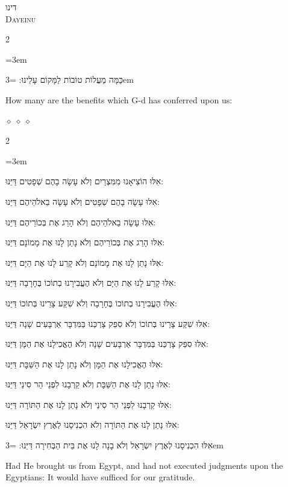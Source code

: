 \documentclass[11pt, openany]{book}
\newenvironment{bilingual}{%
  \par\vspace{4pt}%
  \begin{paracol}{2}%
}{%
  \end{paracol}%
  \par\vspace{2pt}%
}
\newenvironment{hebrewcol}{%
  \switchcolumn[1]%
  \begingroup
  \RTL
  \hebrewfont\large
  \setstretch{1.4}%
  \emergencystretch=3em
  \tolerance=9999
  \parindent=0pt\relax
}{%
  \endRTL
  \endgroup
}
\newenvironment{englishcol}{%
  \switchcolumn[0]%
  \begingroup
  \setstretch{1.4}%
  \emergencystretch=3em
  \tolerance=9999
  \normalsize
  \rightskip=0.12in\relax
}{%
  \endgroup
}
\newcommand{\parasep}{%
  \par\vspace{3pt}
  \begin{center}
    \textcolor{sedergold!50}{\tiny$\diamond\;\diamond\;\diamond$}
  \end{center}
  \par\vspace{3pt}
}
\newcommand{\subsedertitle}[2]{%
  \par\vspace{8pt}
  \begin{center}
    {\hebrewfontlarge\textcolor{sederblue}{\beginR #1\endR}}\\[3pt]
    {\normalsize\scshape\textcolor{sederblue}{#2}}
  \end{center}
  \par\vspace{3pt}
}
\begin{document}
\subsedertitle{דינו}{Dayeinu}


\begin{bilingual}
\begin{hebrewcol}
כַּמָּה מַעֲלוֹת טוֹבוֹת לַמָּקוֹם עָלֵינוּ:
\end{hebrewcol}
\begin{englishcol}
How many are the benefits which G-d has conferred upon us:
\end{englishcol}
\end{bilingual}
\parasep

\begin{bilingual}
\begin{hebrewcol}
אִלּוּ הוֹצִיאָנוּ מִמִּצְרַיִם וְלֹא עָשָׂה בָהֶם שְׁפָטִים דַּיֵּנוּ:

אִלּוּ עָשָׂה בָהֶם שְׁפָטִים וְלֹא עָשָׂה בֵאלֹהֵיהֶם דַּיֵּנוּ:

אִלּוּ עָשָׂה בֵאלֹהֵיהֶם וְלֹא הָרַג אֶת בְּכוֹרֵיהֶם דַּיֵּנוּ:

אִלּוּ הָרַג אֶת בְּכוֹרֵיהֶם וְלֹא נָתַן לָנוּ אֶת מָמוֹנָם דַּיֵּנוּ:

אִלּוּ נָתַן לָנוּ אֶת מָמוֹנָם וְלֹא קָרַע לָנוּ אֶת הַיָּם דַּיֵּנוּ:

אִלּוּ קָרַע לָנוּ אֶת הַיָּם וְלֹא הֶעֱבִירָנוּ בְתוֹכוֹ בֶּחָרָבָה דַּיֵּנוּ:

אִלּוּ הֶעֱבִירָנוּ בְתוֹכוֹ בֶּחָרָבָה וְלֹא שִׁקַּע צָרֵינוּ בְּתוֹכוֹ דַּיֵּנוּ:

אִלּוּ שִׁקַּע צָרֵינוּ בְּתוֹכוֹ וְלֹא סִפֵּק צָרְכֵּנוּ בַּמִּדְבָּר אַרְבָּעִים שָׁנָה			 דַּיֵּנוּ:

אִלּוּ סִפֵּק צָרְכֵּנוּ בַּמִּדְבָּר אַרְבָּעִים שָׁנָה וְלֹא הֶאֱכִילָנוּ אֶת הַמָּן			 דַּיֵּנוּ:

אִלּוּ הֶאֱכִילָנוּ אֶת הַמָּן וְלֹא נָתַן לָנוּ אֶת הַשַּׁבָּת דַּיֵּנוּ:

אִלּוּ נָתַן לָנוּ אֶת הַשַּׁבָּת וְלֹא קֵרְבָנוּ לִפְנֵי הַר סִינַי דַּיֵּנוּ:

אִלּוּ קֵרְבָנוּ לִפְנֵי הַר סִינַי וְלֹא נָתַן לָנוּ אֶת הַתּוֹרָה דַּיֵּנוּ:

אִלּוּ נָתַן לָנוּ אֶת הַתּוֹרָה וְלֹא הִכְנִיסָנוּ לְאֶרֶץ יִשְׂרָאֵל דַּיֵּנוּ:

אִלּוּ הִכְנִיסָנוּ לְאֶרֶץ יִשְׂרָאֵל וְלֹא בָנָה לָנוּ אֶת בֵּית הַבְּחִירָה			 דַּיֵּנוּ:
\end{hebrewcol}
\begin{englishcol}
Had He brought us from Egypt, and had not executed judgments upon the Egyptians: It would have sufficed for our gratitude.


\end{englishcol}
\end{bilingual}
\end{document}
